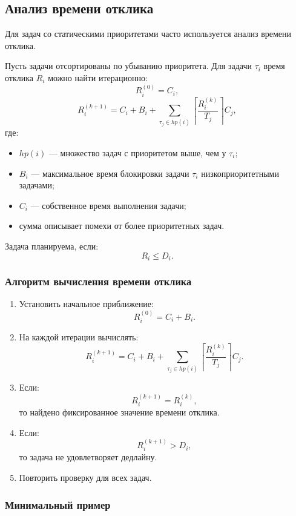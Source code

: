 \documentclass[12pt,a4paper]{article}
\begin{document}
\subsection{Анализ времени отклика}

Для задач со статическими приоритетами часто используется анализ времени отклика.

Пусть задачи отсортированы по убыванию приоритета. Для задачи $\tau_i$ время отклика $R_i$ можно найти итерационно:
\[
    R_i^{(0)} = C_i,
\]
\[
    R_i^{(k+1)}
    =
    C_i + B_i +
    \sum_{\tau_j \in hp(i)}
    \left\lceil
        \frac{R_i^{(k)}}{T_j}
    \right\rceil C_j,
\]
где:
\begin{itemize}
    \item $hp(i)$ --- множество задач с приоритетом выше, чем у $\tau_i$;
    \item $B_i$ --- максимальное время блокировки задачи $\tau_i$ низкоприоритетными задачами;
    \item $C_i$ --- собственное время выполнения задачи;
    \item сумма описывает помехи от более приоритетных задач.
\end{itemize}

Задача планируема, если:
\[
    R_i \leq D_i.
\]

\subsubsection{Алгоритм вычисления времени отклика}

\begin{enumerate}
    \item Установить начальное приближение:
    \[
        R_i^{(0)} = C_i + B_i.
    \]
    \item На каждой итерации вычислять:
    \[
        R_i^{(k+1)}
        =
        C_i + B_i +
        \sum_{\tau_j \in hp(i)}
        \left\lceil
            \frac{R_i^{(k)}}{T_j}
        \right\rceil C_j.
    \]
    \item Если:
    \[
        R_i^{(k+1)} = R_i^{(k)},
    \]
    то найдено фиксированное значение времени отклика.
    \item Если:
    \[
        R_i^{(k+1)} > D_i,
    \]
    то задача не удовлетворяет дедлайну.
    \item Повторить проверку для всех задач.
\end{enumerate}

\subsubsection{Минимальный пример}
\end{document}
